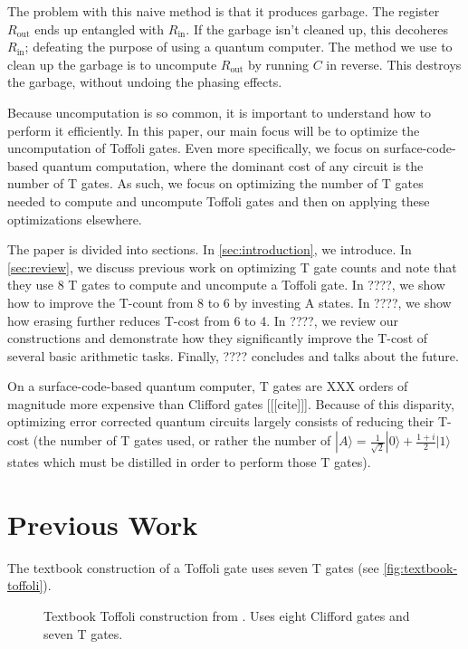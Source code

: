 \documentclass[twocolumn,longbibliography]{quantumarticle-customized}
\newcommand{\qH}{\gate{H}}
\newcommand{\qT}{\gate{T}}
\newcommand{\qTi}{\gate{T^\dagger}}
\begin{document}
The problem with this naive method is that it produces garbage.
The register $R_\text{out}$ ends up entangled with $R_\text{in}$.
If the garbage isn't cleaned up, this decoheres $R_\text{in}$; defeating the purpose of using a quantum computer.
The method we use to clean up the garbage is to uncompute $R_\text{out}$ by running $C$ in reverse.
This destroys the garbage, without undoing the phasing effects.

Because uncomputation is so common, it is important to understand how to perform it efficiently.
In this paper, our main focus will be to optimize the uncomputation of Toffoli gates.
Even more specifically, we focus on surface-code-based quantum computation, where the dominant cost of any circuit is the number of T gates.
As such, we focus on optimizing the number of T gates needed to compute and uncompute Toffoli gates and then on applying these optimizations elsewhere.

The paper is divided into sections.
In \autoref{sec:introduction}, we introduce.
In \autoref{sec:review}, we discuss previous work on optimizing T gate counts and note that they use 8 T gates to compute and uncompute a Toffoli gate.
In ????, we show how to improve the T-count from 8 to 6 by investing A states.
In ????, we show how erasing further reduces T-cost from 6 to 4.
In ????, we review our constructions and demonstrate how they significantly improve the T-cost of several basic arithmetic tasks.
Finally, ???? concludes and talks about the future.

On a surface-code-based quantum computer, T gates are XXX orders of magnitude more expensive than Clifford gates [[[cite]]].
Because of this disparity, optimizing error corrected quantum circuits largely consists of reducing their T-cost (the number of T gates used, or rather the number of $|A\rangle = \frac{1}{\sqrt{2}} |0\rangle + \frac{1+i}{2} |1\rangle$ states which must be distilled in order to perform those T gates).

\section{Previous Work}
\label{sec:review}

The textbook construction of a Toffoli gate uses seven T gates \cite{Nielsen2009} (see \autoref{fig:textbook-toffoli}).

\begin{figure}
  \resizebox{\linewidth}{!}{
    \Qcircuit @R=1.5em @C=0.7em {
      &\ctrl{1}&\qw & &   & & &\ctrl{1}&\qw  &\ctrl{1}&\qT &\qw     &\qw  &\ctrl{2}&\qw &\qw     &\qw  &\ctrl{2}&\qw &\qw \\
      &\ctrl{1}&\qw & & = & & &\targ   &\qTi &\targ   &\qT &\ctrl{1}&\qw  &\qw     &\qw &\ctrl{1}&\qw  &\qw     &\qw &\qw \\
      &\targ   &\qw & &   & & &\qw     &\qw  &\qH     &\qT &\targ   &\qTi &\targ   &\qT &\targ   &\qTi &\targ   &\qH &\qw \\
    }
  }
  \caption{
	Textbook Toffoli construction from \cite{Nielsen2009}.
	Uses eight Clifford gates and seven T gates.
  }
  \label{fig:textbook-toffoli}
\end{figure}
\end{document}
